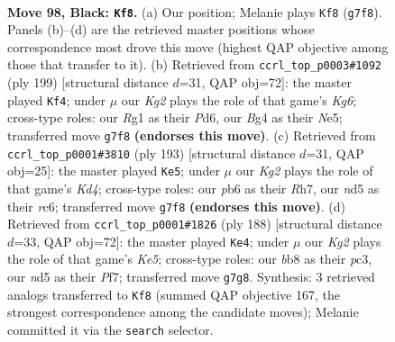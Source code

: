 \documentclass[11pt]{article}
\begin{document}
\clearpage

\begin{figure}[p]\centering
\begin{subfigure}{0.46\textwidth}\centering
\resizebox{\linewidth}{!}{%
\newchessgame
\chessboard[
  setfen={1B6/6kR/1P6/P2N4/4B1b1/1K5p/8/6r1 b - - 2 98},
  showmover=false,
  pgfstyle=straightmove, color=movearrow, markmove={g7-f8}
]}
\caption{}
\end{subfigure}\hfill
\begin{subfigure}{0.46\textwidth}\centering
\resizebox{\linewidth}{!}{%
\newchessgame
\chessboard[
  setfen={8/8/1p1p4/1P1Bn3/1bP5/6k1/6R1/3K4 b - - 76 100},
  showmover=false,
  pgfstyle=straightmove, color=movearrow, markmove={g3-f4}
]}
\caption{}
\end{subfigure}
\\[4pt]
\begin{subfigure}{0.46\textwidth}\centering
\resizebox{\linewidth}{!}{%
\newchessgame
\chessboard[
  setfen={8/7r/2R5/pB1k1p2/P7/5K2/3R4/r7 b - - 36 97},
  showmover=false,
  pgfstyle=straightmove, color=movearrow, markmove={d5-e5}
]}
\caption{}
\end{subfigure}\hfill
\begin{subfigure}{0.46\textwidth}\centering
\resizebox{\linewidth}{!}{%
\newchessgame
\chessboard[
  setfen={2b5/5PR1/2k5/4Kr2/1p4p1/1Pp5/2P5/1B6 w - - 1 95},
  showmover=false,
  pgfstyle=straightmove, color=movearrow, markmove={e5-e4}
]}
\caption{}
\end{subfigure}
\caption{\textbf{Move 98, Black: \texttt{Kf8}.} (a) Our position; Melanie plays \texttt{Kf8} (\texttt{g7f8}). Panels (b)--(d) are the retrieved master positions whose correspondence most drove this move (highest QAP objective among those that transfer to it). (b) Retrieved from \texttt{ccrl\_top\_p0003\#1092} (ply 199) [structural distance $d$=31, QAP obj=72]: the master played \texttt{Kf4}; under $\mu$ our \emph{Kg2} plays the role of that game's \emph{Kg6}; cross-type roles: our \emph{R}g1 as their \emph{P}d6, our \emph{B}g4 as their \emph{N}e5; transferred move \texttt{g7f8} \textbf{(endorses this move)}. (c) Retrieved from \texttt{ccrl\_top\_p0001\#3810} (ply 193) [structural distance $d$=31, QAP obj=25]: the master played \texttt{Ke5}; under $\mu$ our \emph{Kg2} plays the role of that game's \emph{Kd4}; cross-type roles: our \emph{p}b6 as their \emph{R}h7, our \emph{n}d5 as their \emph{r}c6; transferred move \texttt{g7f8} \textbf{(endorses this move)}. (d) Retrieved from \texttt{ccrl\_top\_p0001\#1826} (ply 188) [structural distance $d$=33, QAP obj=72]: the master played \texttt{Ke4}; under $\mu$ our \emph{Kg2} plays the role of that game's \emph{Ke5}; cross-type roles: our \emph{b}b8 as their \emph{p}c3, our \emph{n}d5 as their \emph{P}f7; transferred move \texttt{g7g8}. Synthesis: 3 retrieved analogs transferred to \texttt{Kf8} (summed QAP objective 167, the strongest correspondence among the candidate moves); Melanie committed it via the \texttt{search} selector.}
\label{fig:thought-m195}
\end{figure}
\end{document}
